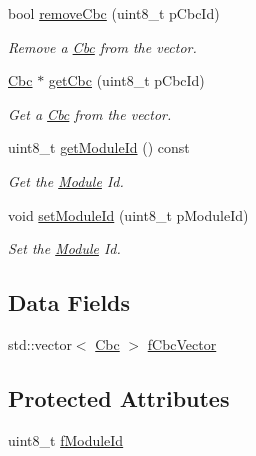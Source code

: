 \begin{CompactItemize}
bool \hyperlink{class_ph2___hw_description_1_1_module_0aa7c940311bd13a32fd4e0f251c2d27}{remove\-Cbc} (uint8\_\-t p\-Cbc\-Id)
\begin{CompactList}\small\item\em Remove a \hyperlink{class_ph2___hw_description_1_1_cbc}{Cbc} from the vector. \item\end{CompactList}\item 
\hyperlink{class_ph2___hw_description_1_1_cbc}{Cbc} $\ast$ \hyperlink{class_ph2___hw_description_1_1_module_05ccbee9ca3eb8022e359b5e9dabe783}{get\-Cbc} (uint8\_\-t p\-Cbc\-Id)
\begin{CompactList}\small\item\em Get a \hyperlink{class_ph2___hw_description_1_1_cbc}{Cbc} from the vector. \item\end{CompactList}\item 
uint8\_\-t \hyperlink{class_ph2___hw_description_1_1_module_4f2cd43cc66506fa093c4635bbb412dd}{get\-Module\-Id} () const 
\begin{CompactList}\small\item\em Get the \hyperlink{class_ph2___hw_description_1_1_module}{Module} Id. \item\end{CompactList}\item 
void \hyperlink{class_ph2___hw_description_1_1_module_4f404f856fdfd3af1459cf47baab1a51}{set\-Module\-Id} (uint8\_\-t p\-Module\-Id)
\begin{CompactList}\small\item\em Set the \hyperlink{class_ph2___hw_description_1_1_module}{Module} Id. \item\end{CompactList}\end{CompactItemize}
\subsection*{Data Fields}
\begin{CompactItemize}
\item 
std::vector$<$ \hyperlink{class_ph2___hw_description_1_1_cbc}{Cbc} $>$ \hyperlink{class_ph2___hw_description_1_1_module_b5cfd93bf927592f609d31f66cd4161b}{f\-Cbc\-Vector}
\end{CompactItemize}
\subsection*{Protected Attributes}
\begin{CompactItemize}
\item 
uint8\_\-t \hyperlink{class_ph2___hw_description_1_1_module_8bf42ae708d304acbc5509edf7f7cee0}{f\-Module\-Id}
\end{CompactItemize}


